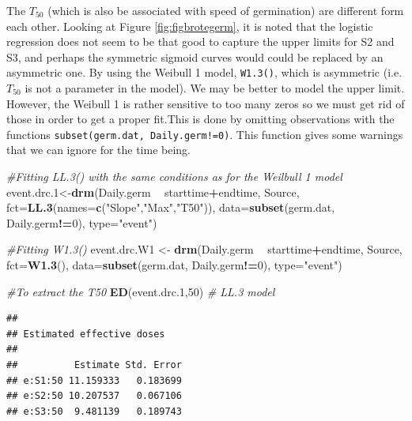 \documentclass[letterpaper,]{book}
\newenvironment{Shaded}{\begin{snugshade}}{\end{snugshade}}
\newcommand{\CommentTok}[1]{\textcolor[rgb]{0.56,0.35,0.01}{\textit{#1}}}
\newcommand{\DataTypeTok}[1]{\textcolor[rgb]{0.13,0.29,0.53}{#1}}
\newcommand{\DecValTok}[1]{\textcolor[rgb]{0.00,0.00,0.81}{#1}}
\newcommand{\FloatTok}[1]{\textcolor[rgb]{0.00,0.00,0.81}{#1}}
\newcommand{\KeywordTok}[1]{\textcolor[rgb]{0.13,0.29,0.53}{\textbf{#1}}}
\newcommand{\NormalTok}[1]{#1}
\newcommand{\OperatorTok}[1]{\textcolor[rgb]{0.81,0.36,0.00}{\textbf{#1}}}
\newcommand{\StringTok}[1]{\textcolor[rgb]{0.31,0.60,0.02}{#1}}
\begin{document}
The \(T_{50}\) (which is also be associated with speed of germination) are different form each other. Looking at Figure \ref{fig:figbrotegerm}, it is noted that the logistic regression does not seem to be that good to capture the upper limits for S2 and S3, and perhaps the symmetric sigmoid curves would could be replaced by an asymmetric one. By using the Weibull 1 model, \texttt{W1.3()}, which is asymmetric (i.e. \(T_{50}\) is not a parameter in the model). We may be better to model the upper limit. However, the Weibull 1 is rather sensitive to too many zeros so we must get rid of those in order to get a proper fit.This is done by omitting observations with the functions \texttt{subset(germ.dat,\ Daily.germ!=0)}. This function gives some warnings that we can ignore for the time being.

\begin{Shaded}
\begin{Highlighting}[]
\CommentTok{#Fitting LL.3() with the same conditions as for the Weilbull 1 model}
\NormalTok{event.drc}\FloatTok{.1}\NormalTok{<-}\KeywordTok{drm}\NormalTok{(Daily.germ }\OperatorTok{~}\StringTok{ }\NormalTok{starttime}\OperatorTok{+}\NormalTok{endtime, Source, }
                 \DataTypeTok{fct=}\KeywordTok{LL.3}\NormalTok{(}\DataTypeTok{names=}\KeywordTok{c}\NormalTok{(}\StringTok{"Slope"}\NormalTok{,}\StringTok{"Max"}\NormalTok{,}\StringTok{"T50"}\NormalTok{)),}
                 \DataTypeTok{data=}\KeywordTok{subset}\NormalTok{(germ.dat, Daily.germ}\OperatorTok{!=}\DecValTok{0}\NormalTok{), }\DataTypeTok{type=}\StringTok{"event"}\NormalTok{)}

\CommentTok{#Fitting W1.3()}
\NormalTok{event.drc.W1 <-}\StringTok{ }\KeywordTok{drm}\NormalTok{(Daily.germ }\OperatorTok{~}\StringTok{ }\NormalTok{starttime}\OperatorTok{+}\NormalTok{endtime, Source, }
                    \DataTypeTok{fct=}\KeywordTok{W1.3}\NormalTok{(), }
                    \DataTypeTok{data=}\KeywordTok{subset}\NormalTok{(germ.dat, Daily.germ}\OperatorTok{!=}\DecValTok{0}\NormalTok{), }\DataTypeTok{type=}\StringTok{"event"}\NormalTok{)}

\CommentTok{#To extract the T50}
\KeywordTok{ED}\NormalTok{(event.drc}\FloatTok{.1}\NormalTok{,}\DecValTok{50}\NormalTok{) }\CommentTok{# LL.3 model}
\end{Highlighting}
\end{Shaded}

\begin{verbatim}
## 
## Estimated effective doses
## 
##          Estimate Std. Error
## e:S1:50 11.159333   0.183699
## e:S2:50 10.207537   0.067106
## e:S3:50  9.481139   0.189743
\end{verbatim}
\end{document}
